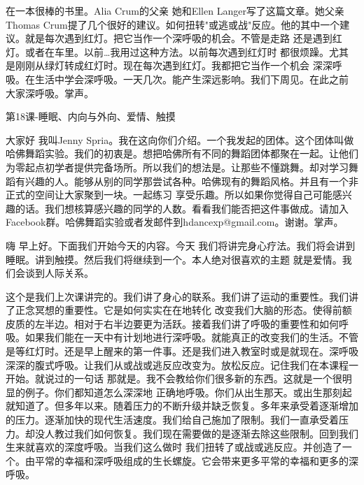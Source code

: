 在一本很棒的书里。Alia Crum的父亲 她和Ellen Langer写了这篇文章。她父亲Thomas Crum提了几个很好的建议。如何扭转"或逃或战"反应。他的其中一个建议。就是每次遇到红灯。把它当作一个深呼吸的机会。不管是走路 还是遇到红灯。或者在车里。以前…我用过这种方法。以前每次遇到红灯时 都很烦躁。尤其是刚刚从绿灯转成红灯时。现在每次遇到红灯。我都把它当作一个机会 深深呼吸。在生活中学会深呼吸。一天几次。能产生深远影响。我们下周见。在此之前 大家深呼吸。掌声。 

第18课-睡眠、内向与外向、爱情、触摸 

大家好 我叫Jenny Spria。我在这向你们介绍。一个我发起的团体。这个团体叫做哈佛舞蹈实验。我们的初衷是。想把哈佛所有不同的舞蹈团体都聚在一起。让他们为零起点初学者提供完备场所。所以我们的想法是。让那些不懂跳舞。却对学习舞蹈有兴趣的人。能够从别的同学那尝试各种。哈佛现有的舞蹈风格。并且有一个非正式的空间让大家聚到一块。一起练习 享受乐趣。所以如果你觉得自己可能感兴趣的话。我们想核算感兴趣的同学的人数。看看我们能否把这件事做成。请加入Facebook群。哈佛舞蹈实验或者发邮件到hdancexp@gmail.com。谢谢。掌声。 

嗨 早上好。下面我们开始今天的内容。今天 我们将讲完身心疗法。我们将会讲到睡眠。讲到触摸。然后我们将继续到一个。本人绝对很喜欢的主题 就是爱情。我们会谈到人际关系。 

这个是我们上次课讲完的。我们讲了身心的联系。我们讲了运动的重要性。我们讲了正念冥想的重要性。它是如何实实在在地转化 改变我们大脑的形态。使得前额皮质的左半边。相对于右半边要更为活跃。接着我们讲了呼吸的重要性和如何呼吸。如果我们能在一天中有计划地进行深呼吸。就能真正的改变我们的生活。不管是等红灯时。还是早上醒来的第一件事。还是我们进入教室时或是就现在。深呼吸 深深的腹式呼吸。让我们从或战或逃反应改变为。放松反应。记住我们在本课程一开始。就说过的一句话 那就是。我不会教给你们很多新的东西。这就是一个很明显的例子。你们都知道怎么深深地 正确地呼吸。你们从出生那天。或出生那刻起就知道了。但多年以来。随着压力的不断升级并缺乏恢复。多年来承受着逐渐增加的压力。逐渐加快的现代生活速度。我们给自己施加了限制。我们一直承受着压力。却没人教过我们如何恢复。我们现在需要做的是逐渐去除这些限制。回到我们生来就喜欢的深度呼吸。当我们这么做时 我们扭转了或战或逃反应。并创造了一个。由平常的幸福和深呼吸组成的生长螺旋。它会带来更多平常的幸福和更多的深呼吸。 

